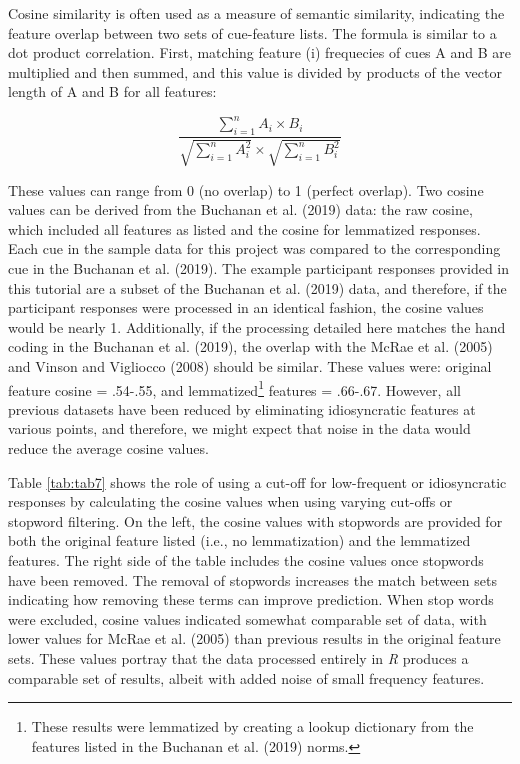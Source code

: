 \documentclass[man]{apa6}
\let\rmarkdownfootnote\footnote%
\def\footnote{\protect\rmarkdownfootnote}
\begin{document}
Cosine similarity is often used as a measure of semantic similarity, indicating the feature overlap between two sets of cue-feature lists. The formula is similar to a dot product correlation. First, matching feature (i) frequecies of cues A and B are multiplied and then summed, and this value is divided by products of the vector length of A and B for all features:

\[
\frac{\sum \limits_{i=1}^{n} A_i \times B_i}{\sqrt{\sum \limits_{i=1}^{n} A_i^2}\times\sqrt{\sum \limits_{i=1}^{n}B_i^2}}
\]

These values can range from 0 (no overlap) to 1 (perfect overlap). Two cosine values can be derived from the Buchanan et al. (2019) data: the raw cosine, which included all features as listed and the cosine for lemmatized responses. Each cue in the sample data for this project was compared to the corresponding cue in the Buchanan et al. (2019). The example participant responses provided in this tutorial are a subset of the Buchanan et al. (2019) data, and therefore, if the participant responses were processed in an identical fashion, the cosine values would be nearly 1. Additionally, if the processing detailed here matches the hand coding in the Buchanan et al. (2019), the overlap with the McRae et al. (2005) and Vinson and Vigliocco (2008) should be similar. These values were: original feature cosine = .54-.55, and lemmatized\footnote{These results were lemmatized by creating a lookup dictionary from the features listed in the Buchanan et al. (2019) norms.} features = .66-.67. However, all previous datasets have been reduced by eliminating idiosyncratic features at various points, and therefore, we might expect that noise in the data would reduce the average cosine values.

Table \ref{tab:tab7} shows the role of using a cut-off for low-frequent or idiosyncratic responses by calculating the cosine values when using varying cut-offs or stopword filtering. On the left, the cosine values with stopwords are provided for both the original feature listed (i.e., no lemmatization) and the lemmatized features. The right side of the table includes the cosine values once stopwords have been removed. The removal of stopwords increases the match between sets indicating how removing these terms can improve prediction. When stop words were excluded, cosine values indicated somewhat comparable set of data, with lower values for McRae et al. (2005) than previous results in the original feature sets. These values portray that the data processed entirely in \emph{R} produces a comparable set of results, albeit with added noise of small frequency features.
\end{document}
